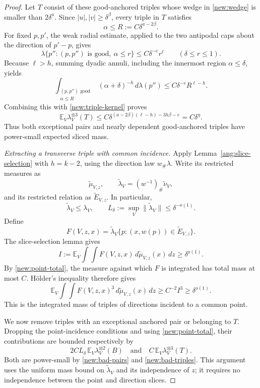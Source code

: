 \begin{proof}
Let \(T\) consist of these good-anchored triples whose wedge in
\eqref{new:wedge} is smaller than \(2\delta^a\). Since
\(|u|,|v|\ge\delta^\beta\), every triple in \(T\) satisfies
\[
\alpha\le R:=C\delta^{a-2\beta}.
\]
For fixed \(p,p'\), the weak radial estimate, applied to the two antipodal caps about the direction of \(p'-p\), gives
\[
\lambda\{p'':(p,p'')\text{ is good},\ \alpha\le r\}
\le C\delta^{-e}r^\ell
\qquad(\delta\le r\le1).
\]
Because \(\ell>h\), summing dyadic annuli, including the innermost region \(\alpha\le\delta\), yields
\[
\int_{\substack{(p,p'')\text{ good}\\ \alpha\le R}}
(\alpha+\delta)^{-h}\,d\lambda(p'')
\le C\delta^{-e}R^{\ell-h}.
\]
Combining this with \eqref{new:triple-kernel} proves
\begin{equation}\label{new:bad-triples}
\mathbb E_V\lambda_V^{\otimes3}(T)
\le C\delta^{(a-2\beta)(\ell-h)-3h\beta-e}
=C\delta^\eta.
\end{equation}
Thus both exceptional pairs and nearly dependent good-anchored triples have power-small expected sliced mass.

\emph{Extracting a transverse triple with common incidence.}
Apply Lemma~\ref{ang:slice-selection} with \(h=k-2\), using the direction law \(w_\#\lambda\). Write its restricted measures as
\[
\widetilde\mu_{V,z},\qquad
\widetilde\lambda_V=(w^{-1})_\#\widetilde\nu_V,
\]
and its restricted relation as \(\widetilde E_{V,z}\). In particular,
\[
\widetilde\lambda_V\le\lambda_V,
\qquad
L_\delta:=\sup_V\|\widetilde\lambda_V\|
\le\delta^{-o(1)}.
\]
Define
\[
F(V,z,x)=
\widetilde\lambda_V
\{p:(x,w(p))\in\widetilde E_{V,z}\}.
\]
The slice-selection lemma gives
\[
I:=\mathbb E_V\int\!\int F(V,z,x)\,
d\widetilde\mu_{V,z}(x)\,dz\ge\delta^{o(1)}.
\]
By \eqref{new:point-total}, the measure against which \(F\) is integrated has total mass at most \(C\). Hölder's inequality therefore gives
\begin{equation}\label{new:triple-incidence}
\mathbb E_V\int\!\int F(V,z,x)^3\,
d\widetilde\mu_{V,z}(x)\,dz
\ge C^{-2}I^3\ge\delta^{o(1)}.
\end{equation}
This is the integrated mass of triples of directions incident to a common point.

We now remove triples with an exceptional anchored pair or belonging to \(T\). Dropping the point-incidence conditions and using
\eqref{new:point-total}, their contributions are bounded respectively by
\[
2C L_\delta\,
\mathbb E_V\lambda_V^{\otimes2}(B)
\quad\text{and}\quad
C\,\mathbb E_V\lambda_V^{\otimes3}(T).
\]
Both are power-small by \eqref{new:bad-pairs} and
\eqref{new:bad-triples}. This argument uses the uniform mass bound on
\(\widetilde\lambda_V\) and its independence of \(z\); it requires no independence between the point and direction slices.


\end{proof}
